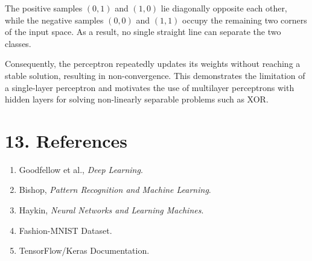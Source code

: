 \documentclass[11pt]{article}
\begin{document}
The positive samples \((0,1)\) and \((1,0)\) lie diagonally opposite each other, while the negative samples \((0,0)\) and \((1,1)\) occupy the remaining two corners of the input space. As a result, no single straight line can separate the two classes.

Consequently, the perceptron repeatedly updates its weights without reaching a stable solution, resulting in non-convergence. This demonstrates the limitation of a single-layer perceptron and motivates the use of multilayer perceptrons with hidden layers for solving non-linearly separable problems such as XOR.

\section*{13. References}
\begin{enumerate}
\item Goodfellow et al., \emph{Deep Learning}.
\item Bishop, \emph{Pattern Recognition and Machine Learning}.
\item Haykin, \emph{Neural Networks and Learning Machines}.
\item Fashion-MNIST Dataset.
\item TensorFlow/Keras Documentation.
\end{enumerate}
\end{document}
